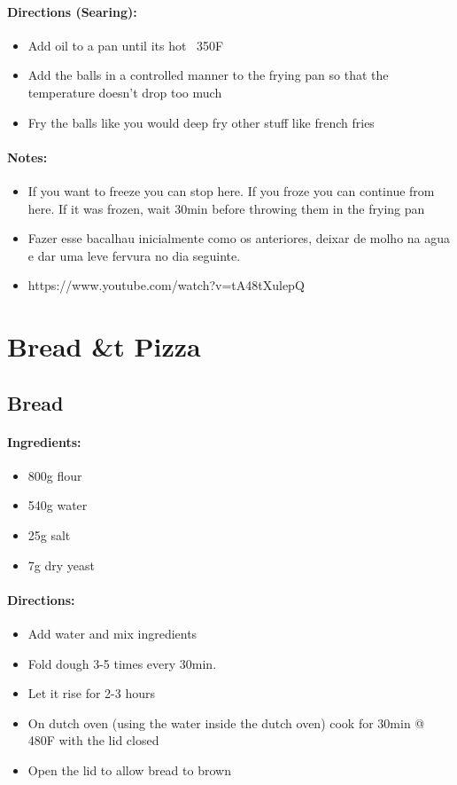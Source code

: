 \documentclass{article}
\begin{document}
\paragraph{Directions (Searing):}
\begin{itemize}
    \item Add oil to a pan until its hot ~350F
    \item Add the balls in a controlled manner to the frying pan so that the temperature doesn't drop too much
    \item Fry the balls like you would deep fry other stuff like french fries
\end{itemize} 

\paragraph{Notes:}
\begin{itemize}
    \item If you want to freeze you can stop here. If you froze you can continue from here. If it was frozen, wait 30min before throwing them in the frying pan
    \item Fazer esse bacalhau inicialmente como os anteriores, deixar de molho na agua e dar uma leve fervura no dia seguinte.
    \item https://www.youtube.com/watch?v=tA48tXulepQ
\end{itemize}

\section{Bread \&t Pizza}


\subsection{Bread}

\paragraph{Ingredients:}
\begin{itemize}
    \item 800g flour
    \item 540g water
    \item 25g salt
    \item 7g dry yeast
\end{itemize}

\paragraph{Directions:}
\begin{itemize}
    \item Add water and mix ingredients
    \item Fold dough 3-5 times every 30min.
    \item Let it rise for 2-3 hours
    \item On dutch oven (using the water inside the dutch oven) cook for 30min @ 480F with the lid closed
    \item Open the lid to allow bread to brown
\end{itemize}
\end{document}
